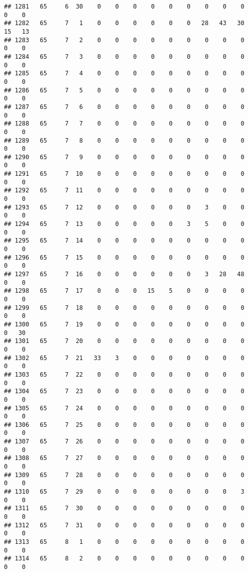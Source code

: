 \documentclass[]{article}
\begin{document}
\begin{verbatim}
## 1281   65     6  30    0    0    0    0    0    0    0    0    0    0    0
## 1282   65     7   1    0    0    0    0    0    0   28   43   30   15   13
## 1283   65     7   2    0    0    0    0    0    0    0    0    0    0    0
## 1284   65     7   3    0    0    0    0    0    0    0    0    0    0    0
## 1285   65     7   4    0    0    0    0    0    0    0    0    0    0    0
## 1286   65     7   5    0    0    0    0    0    0    0    0    0    0    0
## 1287   65     7   6    0    0    0    0    0    0    0    0    0    0    0
## 1288   65     7   7    0    0    0    0    0    0    0    0    0    0    0
## 1289   65     7   8    0    0    0    0    0    0    0    0    0    0    0
## 1290   65     7   9    0    0    0    0    0    0    0    0    0    0    0
## 1291   65     7  10    0    0    0    0    0    0    0    0    0    0    0
## 1292   65     7  11    0    0    0    0    0    0    0    0    0    0    0
## 1293   65     7  12    0    0    0    0    0    0    3    0    0    0    0
## 1294   65     7  13    0    0    0    0    0    3    5    0    0    0    0
## 1295   65     7  14    0    0    0    0    0    0    0    0    0    0    0
## 1296   65     7  15    0    0    0    0    0    0    0    0    0    0    0
## 1297   65     7  16    0    0    0    0    0    0    3   28   48    0    0
## 1298   65     7  17    0    0    0   15    5    0    0    0    0    0    0
## 1299   65     7  18    0    0    0    0    0    0    0    0    0    0    0
## 1300   65     7  19    0    0    0    0    0    0    0    0    0    0   30
## 1301   65     7  20    0    0    0    0    0    0    0    0    0    0    0
## 1302   65     7  21   33    3    0    0    0    0    0    0    0    0    0
## 1303   65     7  22    0    0    0    0    0    0    0    0    0    0    0
## 1304   65     7  23    0    0    0    0    0    0    0    0    0    0    0
## 1305   65     7  24    0    0    0    0    0    0    0    0    0    0    0
## 1306   65     7  25    0    0    0    0    0    0    0    0    0    0    0
## 1307   65     7  26    0    0    0    0    0    0    0    0    0    0    0
## 1308   65     7  27    0    0    0    0    0    0    0    0    0    0    0
## 1309   65     7  28    0    0    0    0    0    0    0    0    0    0    0
## 1310   65     7  29    0    0    0    0    0    0    0    0    3    0    0
## 1311   65     7  30    0    0    0    0    0    0    0    0    0    0    0
## 1312   65     7  31    0    0    0    0    0    0    0    0    0    0    0
## 1313   65     8   1    0    0    0    0    0    0    0    0    0    0    0
## 1314   65     8   2    0    0    0    0    0    0    0    0    0    0    0

\end{verbatim}
\end{document}
